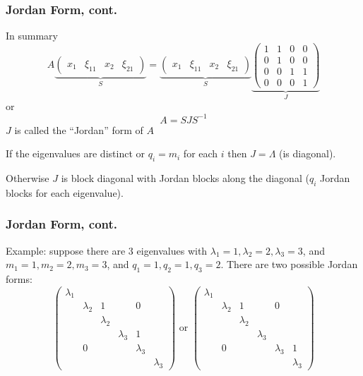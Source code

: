 \documentclass{beamer}
\begin{document}
\begin{frame}\frametitle{Jordan Form, cont.}
	In summary
	\[ 
		A
		\underbrace{
			\begin{pmatrix}
	    		x_1 & \xi_{11} & x_2 & \xi_{21}
	    	\end{pmatrix}
	    }_{S} 
	    = 
	    \underbrace{
	    	\begin{pmatrix}
	    		x_1 & \xi_{11} & x_2 & \xi_{21}
	  		\end{pmatrix}
	  	}_{S}
	  	\underbrace{
	  		\begin{pmatrix}
	  			1& 1 & 0 & 0\\
	  			0 & 1 & 0 & 0\\
	  			0 & 0 & 1 & 1\\
	  			0 & 0 & 0 & 1
			\end{pmatrix}
		}_{J} 
	\]
	or
	\[ 
		A = SJS^{-1} 
	\]
	$J$ is called the ``Jordan'' form of $A$
	
	\vfill
	
	If the eigenvalues are distinct or $q_i = m_i$ for each $i$ then $J =
	\Lambda$ (is diagonal).
	
	\vfill
	
	Otherwise $J$ is block diagonal with Jordan blocks along the diagonal
	($q_i$ Jordan blocks for each eigenvalue).	
\end{frame}

\begin{frame}\frametitle{Jordan Form, cont.}
	
	Example:  suppose there are 3 eigenvalues with $\lambda_1 = 1,
	\lambda_2 = 2, \lambda_3 = 3$, and $m_1=1, m_2=2, m_3=3$, and $q_1 =
	1, q_2 = 1, q_3 = 2$.
	There are two possible Jordan forms:
	\[
	\begin{pmatrix}
	    \lambda_1\\
	    & \lambda_2 & 1 && 0\\
	    & & \lambda_2 & &\\
	    &  & & \lambda_3 & 1\\
	    & 0& & & \lambda_3\\
	    & & & & & \lambda_3
	  \end{pmatrix} \text{ or } 
	\begin{pmatrix}
	    \lambda_1\\
	    & \lambda_2 & 1 && 0\\
	    & & \lambda_2 & & \\
	    & & & \lambda_3\\
	    &0 & & & \lambda_3 & 1\\
	    & & & & & \lambda_3
	  \end{pmatrix}
	\]
\end{frame}
\end{document}
